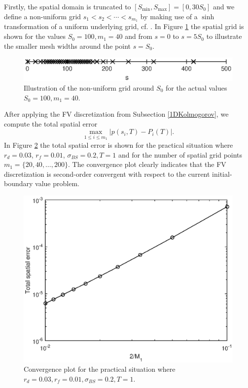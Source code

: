 \documentclass[10pt]{article}
\begin{document}
Firstly, the spatial domain is truncated to $[S_{\min}, S_{\max}] = [0, 30S_{0}]$ and we define a non-uniform grid $s_{1} < s_{2} < \cdots < s_{m_{1}}$ by making use of a $\sinh$ transformation of a uniform underlying grid, cf. \cite{IHF10}. In Figure \ref{fig:Grid1D} the spatial grid is shown for the values $S_{0}=100, m_{1} = 40$ and from $s=0$ to $s=5S_{0}$ to illustrate the smaller mesh widths around the point $s=S_{0}$.
\begin{figure}
\begin{center}
\includegraphics[scale=0.5]{Grid1D.eps}  
\caption{Illustration of the non-uniform grid around $S_{0}$ for the actual values $S_{0}=100, m_{1}=40$.}
\label{fig:Grid1D}
\end{center}
\end{figure}
After applying the FV discretization from Subsection \ref{1DKolmogorov}, we compute the total spatial error
$$ \max_{1 \le i \le m_{1}} \vert p(s_{i},T) - P_{i}(T) \vert. $$
In Figure \ref{fig:Convergence1D} the total spatial error is shown for the practical situation where $r_{d} = 0.03$, $r_{f} = 0.01$, $\sigma_{BS} = 0.2, T=1$ and for the number of spatial grid points $m_{1} = \{ 20, 40, \ldots, 200\}$. 
The convergence plot clearly indicates that the FV discretization is second-order convergent with respect to the current initial-boundary value problem.
\begin{figure}
\begin{center}
\includegraphics[scale=0.5]{Convergence1D.eps}  
\caption{Convergence plot for the practical situation where $r_{d} = 0.03, r_{f} = 0.01, \sigma_{BS} = 0.2, T=1$.}
\label{fig:Convergence1D}
\end{center}
\end{figure}
\end{document}
